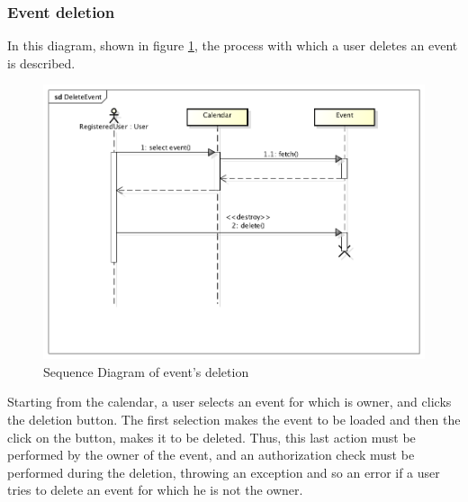 \subsubsection{Event deletion}
In this diagram, shown in figure \ref{fig:delseqdiag}, the process with which a user deletes an event is described.
\begin{center}
 \begin{figure}[H]
    \includegraphics[width=1\textwidth]{../UMLDiagram/sequence/DeleteEvent/DeleteEvent.png}
    \caption{Sequence Diagram of event's deletion}
     \label{fig:delseqdiag}
     \end{figure}
   \end{center}
Starting from the calendar, a user selects an event for which is owner, and clicks the deletion button. The first selection makes the event to be loaded and then the click on the button, makes it to be deleted. Thus, this last action must be performed by the owner of the event, and an authorization check must be performed during the deletion, throwing an exception and so an error if a user tries to delete an event for which he is not the owner.
\newpage
